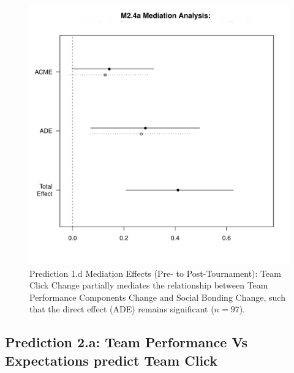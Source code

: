 \begin{CJK}{UTF8}{gbsn}
  \begin{figure}[htbp]
    \centering
    \includegraphics[scale=.5]{images/MLM24aMediationAnalysisOffline1.pdf}
    \caption{Prediction 1.d Mediation Effects (Pre- to Post-Tournament): Team Click Change partially mediates the relationship between Team Performance Components Change and Social Bonding Change, such that the direct effect (ADE) remains significant ($n = 97$).}
    \label{fig:MLM24aMediationAnalysis}
  \end{figure}





















\subsection{Prediction 2.a: Team Performance Vs Expectations predict Team Click\label{sect:prediction1b}}


\end{CJK}
